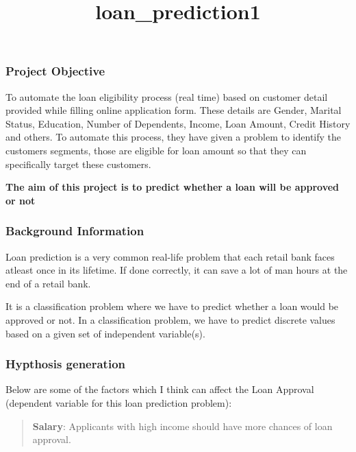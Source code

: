 \documentclass[11pt]{article}
\title{loan\_prediction1}
\begin{document}
    
    
    \maketitle
    
    

    
    \subsubsection{Project Objective}\label{project-objective}

To automate the loan eligibility process (real time) based on customer
detail provided while filling online application form. These details are
Gender, Marital Status, Education, Number of Dependents, Income, Loan
Amount, Credit History and others. To automate this process, they have
given a problem to identify the customers segments, those are eligible
for loan amount so that they can specifically target these customers.

\textbf{The aim of this project is to predict whether a loan will be
approved or not}

    \subsubsection{Background Information}\label{background-information}

Loan prediction is a very common real-life problem that each retail bank
faces atleast once in its lifetime. If done correctly, it can save a lot
of man hours at the end of a retail bank.

    It is a classification problem where we have to predict whether a loan
would be approved or not. In a classification problem, we have to
predict discrete values based on a given set of independent variable(s).

    \subsubsection{Hypthosis generation}\label{hypthosis-generation}

Below are some of the factors which I think can affect the Loan Approval
(dependent variable for this loan prediction problem):

\begin{quote}
\textbf{Salary}: Applicants with high income should have more chances of
loan approval.
\end{quote}
\end{document}
